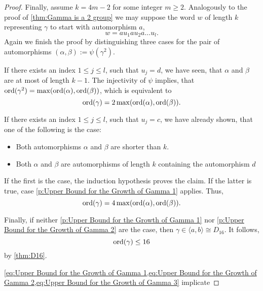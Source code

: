 \begin{proof}
Finally, assume $k=4m-2$ for some integer $m\geq 2$. Analogously to the proof of  \cref{thm:Gamma is a 2 group} we may suppose the word $w$ of length $k$ representing $\gamma$ to start with automorphism $a$, \ie
\begin{equation*}
w=au_1 a u_2 a\ldots u_l.
\end{equation*}
Again we finish the proof by distinguishing three cases for the pair of automorphisms $(\alpha,\beta):=\psi(\gamma^2)$.
\begin{clist}
\item\label{p:Upper Bound for the Growth of Gamma 1} If there exists an index $1\leq j\leq l$, such that $u_j=d$, we have seen, that $\alpha$ and $\beta$ are at most of length $k-1$. The injectivity of $\psi$ implies, that $\operatorname{\mathrm{ord}}(\gamma^2)=\max(\operatorname{\mathrm{ord}}(\alpha),\operatorname{\mathrm{ord}}(\beta))$, which is equivalent to
\begin{equation}\label{eq:Upper Bound for the Growth of Gamma 1}
\operatorname{\mathrm{ord}}(\gamma)=2\max(\operatorname{\mathrm{ord}}(\alpha), \operatorname{\mathrm{ord}}(\beta)).
\end{equation}
\item\label{p:Upper Bound for the Growth of Gamma 2} If there exists an index $1\leq j\leq l$, such that $u_j=c$, we have already shown, that one of the following is the case:
\begin{itemize}
\item Both automorphisms $\alpha$ and $\beta$ are shorter than $k$.
\item Both $\alpha$ and $\beta$ are automorphisms of length $k$ containing the automorphism $d$
\end{itemize}
If the first is the case, the induction hypothesis proves the claim. If the latter is true, case \ref{p:Upper Bound for the Growth of Gamma 1} applies. Thus,
\begin{equation}\label{eq:Upper Bound for the Growth of Gamma 2}
\operatorname{\mathrm{ord}}(\gamma)=4\max(\operatorname{\mathrm{ord}}(\alpha), \operatorname{\mathrm{ord}}(\beta)).
\end{equation}
\item Finally, if neither \ref{p:Upper Bound for the Growth of Gamma 1} nor \ref{p:Upper Bound for the Growth of Gamma 2} are the case, then $\gamma\in\langle a,b\rangle\cong D_{16}$. It follows,
\begin{equation}\label{eq:Upper Bound for the Growth of Gamma 3}
\operatorname{\mathrm{ord}}(\gamma)\leq 16
\end{equation}
by \cref{thm:D16}.
\end{clist}
\cref{eq:Upper Bound for the Growth of Gamma 1,eq:Upper Bound for the Growth of Gamma 2,eq:Upper Bound for the Growth of Gamma 3} implicate

\end{proof}
